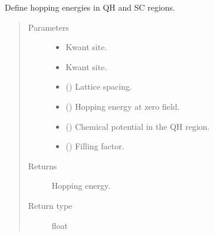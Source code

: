 \documentclass[letterpaper,10pt,english]{sphinxmanual}
\begin{document}
\begin{fulllineitems}
\label{\detokenize{modules:modules.functions.hopping}}
\pysigstartsignatures
{}
\pysigstopsignatures
\sphinxAtStartPar
Define hopping energies in QH and SC regions.
\begin{quote}\begin{description}
\item[{Parameters}] \leavevmode\begin{itemize}
\item {} 
\sphinxAtStartPar
{} \textendash{} Kwant site.

\item {} 
\sphinxAtStartPar
{} \textendash{} Kwant site.

\item {} 
\sphinxAtStartPar
{} () \textendash{} Lattice spacing.

\item {} 
\sphinxAtStartPar
{} () \textendash{} Hopping energy at zero field.

\item {} 
\sphinxAtStartPar
{} () \textendash{} Chemical potential in the QH region.

\item {} 
\sphinxAtStartPar
{} () \textendash{} Filling factor.

\end{itemize}

\item[{Returns}] \leavevmode
\sphinxAtStartPar
Hopping energy.

\item[{Return type}] \leavevmode
\sphinxAtStartPar
float

\end{description}\end{quote}

\end{fulllineitems}
\end{document}
